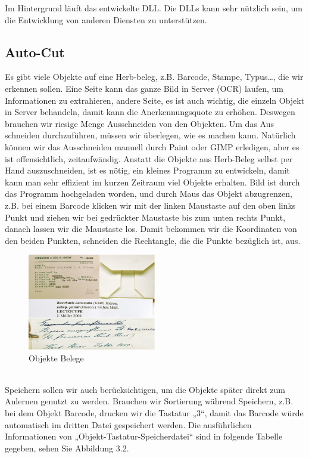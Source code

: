 \documentclass[10pt,a4paper]{report}
\begin{document}
Im Hintergrund läuft das entwickelte DLL. Die DLLs kann sehr nützlich sein, um die Entwicklung von anderen Diensten zu unterstützen.

\subsection{Auto-Cut}
Es gibt viele Objekte auf eine Herb-beleg, z.B. Barcode, Stampe, Typus…, die wir erkennen sollen. Eine Seite kann das ganze Bild in Server (OCR) laufen, um Informationen zu extrahieren, andere Seite, es ist auch wichtig, die einzeln Objekt in Server behandeln, damit kann die Anerkennungsquote zu erhöhen. Deswegen brauchen wir riesige Menge Ausschneiden von den Objekten.
Um das Aus schneiden durchzuführen, müssen wir überlegen, wie es machen kann. Natürlich können wir das Ausschneiden manuell durch Paint oder GIMP erledigen, aber es ist offensichtlich, zeitaufwändig. Anstatt die Objekte aus Herb-Beleg selbst per Hand auszuschneiden, ist es nötig, ein kleines Programm zu entwickeln, damit kann man sehr effizient im kurzen Zeitraum viel Objekte erhalten. 
Bild ist durch das Programm hochgeladen worden, und durch Maus das Objekt abzugrenzen, z.B. bei einem Barcode klicken wir mit der linken Maustaste auf den oben links Punkt und ziehen wir bei gedrückter Maustaste bis zum unten rechts Punkt, danach lassen wir die Maustaste los. Damit bekommen wir die Koordinaten von den beiden Punkten, schneiden die Rechtangle, die die Punkte bezüglich ist, aus.\\
\begin{figure}[htbp] 
	\centering
	\includegraphics[width=0.5\textwidth]{Cutobjekte.png}
	\caption{Objekte Belege}
	\label{fig:Bild 2}
\end{figure}\\
Speichern sollen wir auch berücksichtigen, um die Objekte später direkt zum Anlernen genutzt zu werden. Brauchen wir Sortierung während Speichern, z.B. bei dem Objekt Barcode, drucken wir die Tastatur „3“, damit das Barcode würde automatisch im dritten Datei gespeichert werden. Die ausführlichen Informationen von „Objekt-Tastatur-Speicherdatei“  sind in folgende Tabelle gegeben, sehen Sie Abbildung 3.2.\\
\end{document}
